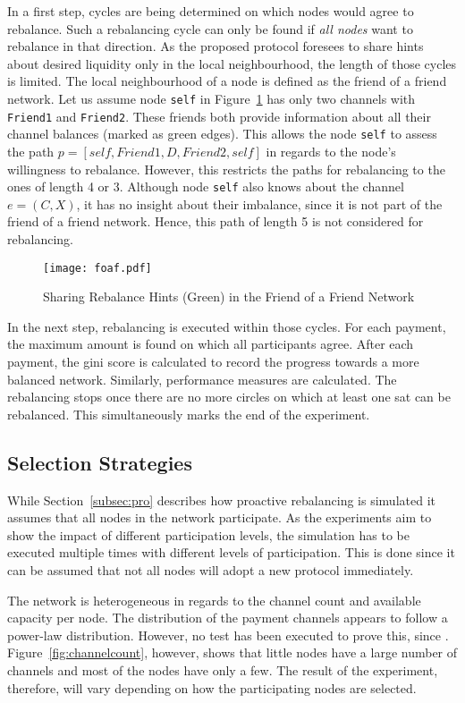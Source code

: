 \documentclass[final]{fhnwreport}       %
\begin{document}
In a first step, cycles are being determined on which nodes would agree to rebalance. Such a rebalancing cycle can only be found if \emph{all nodes} want to rebalance in that direction. As the proposed protocol foresees to share hints about desired liquidity only in the local neighbourhood, the length of those cycles is limited. The local neighbourhood of a node is defined as the friend of a friend network. Let us assume node \texttt{self} in Figure~\ref{fig:foaf} has only two channels with \texttt{Friend1} and \texttt{Friend2}. These friends both provide information about all their channel balances (marked as green edges). This allows the node \texttt{self} to assess the path $p = [self, Friend1, D, Friend2, self]$ in regards to the node's willingness to rebalance. However, this restricts the paths for rebalancing to the ones of length 4 or 3. Although node \texttt{self} also knows about the channel $e = (C, X)$, it has no insight about their imbalance, since it is not part of the friend of a friend network. Hence, this path of length 5 is not considered for rebalancing.

\begin{figure}[H]
\centering
\texttt{[image: foaf.pdf]}
\caption{Sharing Rebalance Hints (Green) in the Friend of a Friend Network}
\label{fig:foaf}
\end{figure}

In the next step, rebalancing is executed within those cycles. For each payment, the maximum amount is found on which all participants agree. After each payment, the \gls{gini} score is calculated to record the progress towards a more balanced network. Similarly, performance measures are calculated. The rebalancing stops once there are no more circles on which at least one sat can be rebalanced. This simultaneously marks the end of the experiment.


\subsection{Selection Strategies}\label{subsec:selstrat}
While Section~\ref{subsec:pro} describes how proactive rebalancing is simulated it assumes that all nodes in the network participate. As the experiments aim to show the impact of different participation levels, the simulation has to be executed multiple times with different levels of participation. This is done since it can be assumed that not all nodes will adopt a new protocol immediately.

The network is heterogeneous in regards to the channel count and available capacity per node. The distribution of the payment channels appears to follow a power-law distribution. However, no test has been executed to prove this, since . Figure~\ref{fig:channelcount}, however, shows that little nodes have a large number of channels and most of the nodes have only a few. The result of the experiment, therefore, will vary depending on how the participating nodes are selected. 
\end{document}
